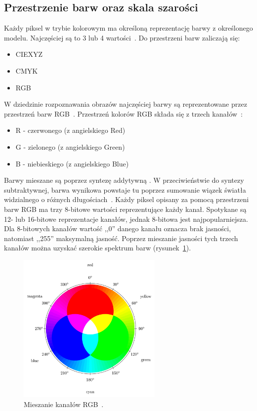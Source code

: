 \documentclass[a4paper,twoside,12pt]{book}
\begin{document}
    \subsection{Przestrzenie barw oraz skala szarości}\label{subsec:konwersja-do-skali-szarości-oraz-przestrzenie-barw}
    Każdy piksel w trybie kolorowym ma określoną reprezentację barwy z określonego modelu.
    Najczęściej są to 3 lub 4 wartości~\cite{przestrzenieKolorow}.
    Do przestrzeni barw zaliczają się:
    \begin{itemize}
        \item CIEXYZ
        \item CMYK
        \item RGB
    \end{itemize}

    W dziedzinie rozpoznawania obrazów najczęściej barwy są reprezentowane przez przestrzeń barw
    RGB~\cite{przestrzenieKolorow}.
    Przestrzeń kolorów RGB składa się z trzech kanałów~\cite{kolory}:
    \begin{itemize}
        \item R - czerwonego (z angielskiego Red)
        \item G - zielonego (z angielskiego Green)
        \item B - niebieskiego (z angielskiego Blue)
    \end{itemize}
    Barwy mieszane są poprzez syntezę addytywną .
    W przeciwieństwie do syntezy subtraktywnej, barwa wynikowa powstaje tu poprzez sumowanie wiązek światła widzialnego o
    różnych długościach~\cite{przestrzenieKolorow}.
    Każdy piksel opisany za pomocą przestrzeni barw RGB ma trzy 8-bitowe wartości reprezentujące każdy kanał.
    Spotykane
    są 12- lub 16-bitowe reprezentacje kanałów, jednak 8-bitowa jest najpopularniejsza.
    Dla 8-bitowych kanałów
    wartość ,,0''
    danego kanału oznacza brak jasności, natomiast ,,255'' maksymalną jasność.
    Poprzez mieszanie jasności tych trzech kanałów
    można uzyskać szerokie spektrum barw (rysunek~\ref{fig.mieszanieKolorow}).

    \begin{figure}[h!]
        \centering
        \includegraphics[width=7cm]{Obrazy/mieszanieKolorow.jpg}
        \caption{Mieszanie kanałów RGB~\cite{colorMixing}.}
        \label{fig.mieszanieKolorow}
    \end{figure}
\end{document}

